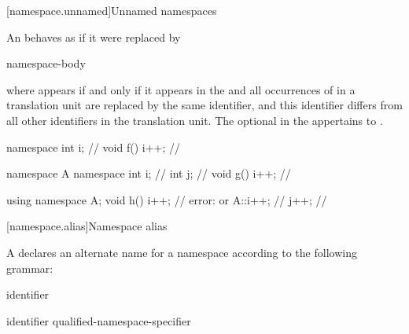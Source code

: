 [namespace.unnamed]{Unnamed namespaces}%

\pnum
An  behaves as if it were
replaced by
\begin{ncsimplebnf}
   \terminal{\{}  \terminal{\}}\br
{}   \terminal{;}\br
{}  \terminal{\{} namespace-body \terminal{\}}
\end{ncsimplebnf}
where
 appears if and only if it appears in the
and all occurrences of  in a translation unit are replaced by
the same identifier, and this identifier differs from all other
identifiers in the translation unit.
The optional 
in the 
appertains to .
\begin{example}
\begin{codeblock}
namespace { int i; }            // 
void f() { i++; }               // 

namespace A {
  namespace {
    int i;                      // 
    int j;                      // 
  }
  void g() { i++; }             // 
}

using namespace A;
void h() {
  i++;                          // error:  or 
  A::i++;                       // 
  j++;                          // 
}
\end{codeblock}
\end{example}

[namespace.alias]{Namespace alias}%
%
%

\pnum
A  declares an alternate name for a
namespace according to the following grammar:

\begin{bnf}
\br
        identifier
\end{bnf}

\begin{bnf}
\br
         identifier \terminal{=} qualified-namespace-specifier \terminal{;}
\end{bnf}

